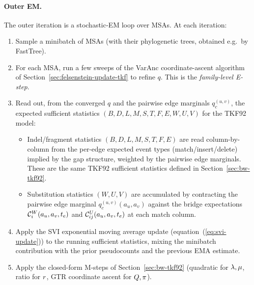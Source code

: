 \paragraph{Outer EM.}
The outer iteration is a stochastic-EM loop over MSAs.  At each
iteration:
\begin{enumerate}[nosep]
\item Sample a minibatch of MSAs (with their phylogenetic trees,
  obtained e.g.\ by FastTree).
\item For each MSA, run a few sweeps of the VarAnc coordinate-ascent
  algorithm of Section~\ref{sec:felsenstein-update-tkf} to refine
  $q$.  This is the \emph{family-level E-step}.
\item Read out, from the converged $q$ and the pairwise edge
  marginals $q_c^{(u,v)}$, the expected sufficient statistics
  $(B,D,L,M,S,T,F,E,W,U,V)$ for the TKF92 model:
  \begin{itemize}[nosep]
  \item Indel/fragment statistics $(B,D,L,M,S,T,F,E)$ are read
    column-by-column from the per-edge expected event types
    (match/insert/delete) implied by the gap structure, weighted
    by the pairwise edge marginals.  These are the same TKF92
    sufficient statistics defined in Section~\ref{sec:bw-tkf92}.
  \item Substitution statistics $(W,U,V)$ are accumulated by
    contracting the pairwise edge marginal $q_c^{(u,v)}(a_u,a_v)$
    against the bridge expectations
    $\mathcal{C}^W_i(a_u,a_v,t_e)$ and $\mathcal{C}^U_{ij}(a_u,a_v,t_e)$ at
    each match column.
  \end{itemize}
\item Apply the SVI exponential moving average update
  (equation~(\ref{eq:svi-update})) to the running sufficient
  statistics, mixing the minibatch contribution with the prior
  pseudocounts and the previous EMA estimate.
\item Apply the closed-form M-steps of Section~\ref{sec:bw-tkf92}
  (quadratic for $\lambda,\mu$, ratio for $r$, GTR coordinate
  ascent for $Q,\pi$).
\end{enumerate}

